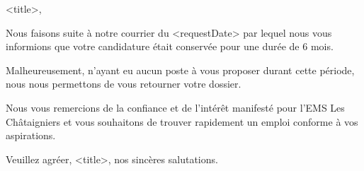 
<title>,

Nous faisons suite à notre courrier du <requestDate> par lequel nous vous informions que votre candidature était conservée pour une durée de 6 mois.

Malheureusement, n’ayant eu aucun poste à vous proposer durant cette période, nous nous permettons de vous retourner votre dossier. 

Nous vous remercions de la confiance et de l’intérêt manifesté pour l’EMS Les Châtaigniers et vous souhaitons de trouver rapidement un emploi conforme à vos aspirations.

Veuillez agréer, <title>, nos sincères salutations.



